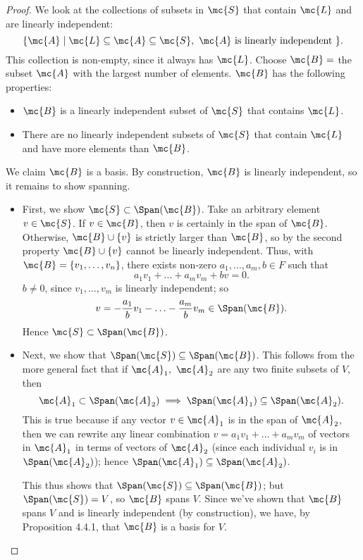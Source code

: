 \documentclass[math1530-lecture-notes]{subfiles}
\begin{document}
\begin{proof}[Proof]
  We look at the collections of subsets in $\mc{S}$ that contain $\mc{L}$ and are linearly
  independent: \[
    \{\mc{A}\mid \mc{L}\subseteq \mc{A}\subseteq \mc{S}, ~\text{$\mc{A}$ is linearly independent}~\} 
  .\] This collection is non-empty, since it always has $\mc{L}$. Choose $\mc{B}=$ the subset
  $\mc{A}$ with the largest number of elements. $\mc{B}$ has the following properties:
  \begin{itemize}
    \item $\mc{B}$ is a linearly independent subset of $\mc{S}$ that contains $\mc{L}$.
    \item There are no linearly independent subsets of $\mc{S}$ that contain $\mc{L}$ and have more
      elements than $\mc{B}$.
  \end{itemize}
  We claim $\mc{B}$ is a basis. By construction, $\mc{B}$ is linearly independent, so it remains to
  show spanning.
  \begin{itemize}
    \item First, we show $\mc{S}\subset \Span(\mc{B})$. Take an arbitrary element $v\in \mc{S}$. If $v\in
      \mc{B}$, then $v$ is certainly in the span of $\mc{B}$. Otherwise, $\mc{B}\cup \{ v \}$ is
      strictly larger than $\mc{B}$, so by the second property $\mc{B}\cup \{ v \}$ cannot be
      linearly independent. Thus, with $\mc{B}=\{ v_1,\ldots,v_n \}$, there exists non-zero
      $a_1,\ldots,a_m,b\in F$ such that \[
        a_1v_1+\ldots+a_mv_m+bv=0
      .\] $b\neq 0$, since $v_1,\ldots,v_m$ is linearly independent; so \[
        v=-\frac{a_1}{b}v_1-\ldots-\frac{a_m}{b}v_m\in \Span(\mc{B})
      .\] Hence $\mc{S}\subset \Span(\mc{B})$.
    \item Next, we show that $\Span(\mc{S})\subseteq \Span(\mc{B})$. This follows from the more
      general fact that if $\mc{A}_1,\ \mc{A}_2$ are any two finite subsets of $V$, then \[
        \mc{A}_1 \subset \Span(\mc{A}_2) \implies \Span(\mc{A}_1)\subseteq \Span(\mc{A}_2)
      .\] This is true because if any vector $v\in \mc{A}_1$ is in the span of $\mc{A}_2$, then we
      can rewrite any linear combination $v=a_1v_1+\ldots+a_mv_m$ of vectors in $\mc{A}_1$ in terms
      of vectors of $\mc{A}_2$ (since each individual $v_i$ is in $\Span(\mc{A}_2)$); hence
      $\Span(\mc{A}_1)\subseteq \Span(\mc{A}_2)$.

      This thus shows that $\Span(\mc{S})\subseteq \Span(\mc{B})$; but $\Span(\mc{S})=V$, so
      $\mc{B}$ spans $V$. Since we've shown that $\mc{B}$ spans $V$ and is linearly independent (by
      construction), we have, by Proposition 4.4.1, that $\mc{B}$ is a basis for $V$.
  \end{itemize}
\end{proof}
\end{document}
